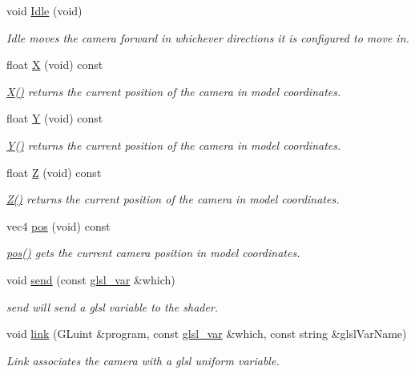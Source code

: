\begin{DoxyCompactItemize}
void \hyperlink{class_camera_aec3559fe43597656629fdb00157d3c73}{\-Idle} (void)
\begin{DoxyCompactList}\small\item\em \-Idle moves the camera forward in whichever directions it is configured to move in. \end{DoxyCompactList}\item 
float \hyperlink{class_camera_a2f7fd64d5d6e0dfb5edcca53c7d15994}{\-X} (void) const 
\begin{DoxyCompactList}\small\item\em \hyperlink{class_camera_a2f7fd64d5d6e0dfb5edcca53c7d15994}{\-X()} returns the current position of the camera in model coordinates. \end{DoxyCompactList}\item 
float \hyperlink{class_camera_a37529ef93871f547ebfd5862bc6cce62}{\-Y} (void) const 
\begin{DoxyCompactList}\small\item\em \hyperlink{class_camera_a37529ef93871f547ebfd5862bc6cce62}{\-Y()} returns the current position of the camera in model coordinates. \end{DoxyCompactList}\item 
float \hyperlink{class_camera_abf1730e47e8e51c76acbddcaa85e2475}{\-Z} (void) const 
\begin{DoxyCompactList}\small\item\em \hyperlink{class_camera_abf1730e47e8e51c76acbddcaa85e2475}{\-Z()} returns the current position of the camera in model coordinates. \end{DoxyCompactList}\item 
vec4 \hyperlink{class_camera_a9982ac5f48fe0af97fefa725080d6da6}{pos} (void) const 
\begin{DoxyCompactList}\small\item\em \hyperlink{class_camera_a9982ac5f48fe0af97fefa725080d6da6}{pos()} gets the current camera position in model coordinates. \end{DoxyCompactList}\item 
void \hyperlink{class_camera_a36cba68c08136242bf5d906f9c0b610c}{send} (const \hyperlink{class_camera_a6ff726a75a430e4f17e5dec42e4d4405}{glsl\-\_\-var} \&which)
\begin{DoxyCompactList}\small\item\em send will send a glsl variable to the shader. \end{DoxyCompactList}\item 
void \hyperlink{class_camera_ab7574214240c67ca774255ef1d7616de}{link} (\-G\-Luint \&program, const \hyperlink{class_camera_a6ff726a75a430e4f17e5dec42e4d4405}{glsl\-\_\-var} \&which, const string \&glsl\-Var\-Name)
\begin{DoxyCompactList}\small\item\em \-Link associates the camera with a glsl uniform variable. \end{DoxyCompactList}\end{DoxyCompactItemize}
